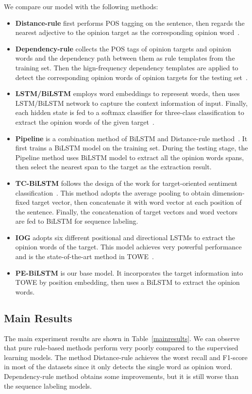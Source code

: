 \documentclass[letterpaper]{article} \usepackage{aaai20}  \usepackage{times}  \usepackage{helvet} \usepackage{courier}  \usepackage[hyphens]{url}  \usepackage{graphicx} \urlstyle{rm} \def\UrlFont{\rm}  \usepackage{graphicx}
\begin{document}
We compare our model with the following methods:
\begin{itemize}
	\item  \textbf{Distance-rule} first performs POS tagging on the sentence, then regards the nearest adjective to the opinion target as the corresponding opinion word~\cite{DBLP:conf/kdd/HuL04}.
	\item  \textbf{Dependency-rule} collects the POS tags of opinion targets and opinion words and the dependency path between them as rule templates from the training set. Then the hign-frequency dependency templates are applied to detect the corresponding opinion words of opinion targets for the testing set~\cite{DBLP:conf/cikm/ZhuangJZ06}.
	\item  \textbf{LSTM/BiLSTM} employs word embeddings to represent words, then uses LSTM/BiLSTM network to capture the context information of input. Finally, each hidden state is fed to a softmax classifier for three-class classification to extract the opinion words of the given target~\cite{DBLP:conf/emnlp/LiuJM15}.
	\item  \textbf{Pipeline} is a combination method of BiLSTM and Distance-rule method~\cite{DBLP:conf/naacl/FanWDHC19}. It first trains a BiLSTM model on the training set. During the testing stage, the Pipeline method uses BiLSTM model to extract all the opinion words spans, then select the nearest span to the target as the extraction result.
	\item  \textbf{TC-BiLSTM} follows the design of the work for target-oriented sentiment classification~\cite{DBLP:conf/coling/TangQFL16}. This method adopts the average pooling to obtain dimension-fixed target vector, then concatenate it with word vector at each position of the sentence. Finally, the concatenation of target vectors and word vectors are fed to BiLSTM for sequence labeling.
	\item  \textbf{IOG} adopts six different positional and directional LSTMs to extract the opinion words of the target. This model achieves very powerful performance and is the state-of-the-art method in TOWE~\cite{DBLP:conf/naacl/FanWDHC19}.
	\item  \textbf{PE-BiLSTM} is our base model. It incorporates the target information into TOWE by position embedding, then uses a BiLSTM to extract the opinion words.
\end{itemize}


\subsection{Main Results}
The main experiment results are shown in Table~\ref{mainresults}. We can observe that pure rule-based methods perform very poorly compared to the supervised learning models. The method Distance-rule achieves the worst recall and F1-score in most of the datasets since it only detects the single word as opinion word.  Dependency-rule method obtains some improvements, but it is still worse than the sequence labeling models.
\end{document}
